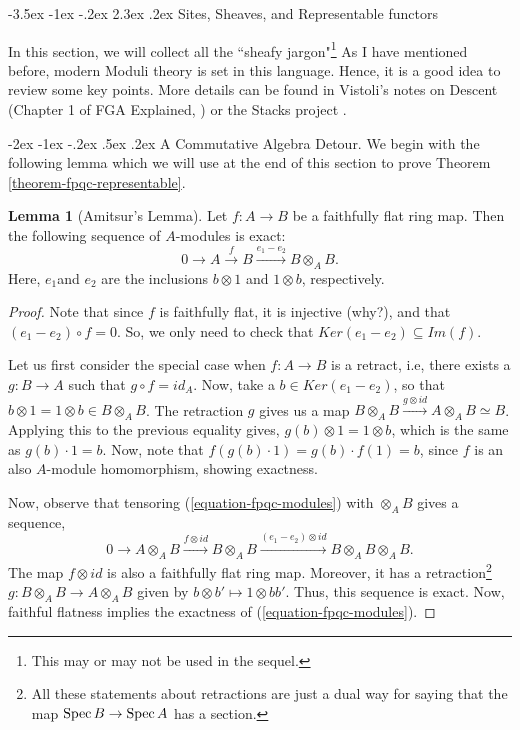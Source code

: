 \documentclass[11pt]{amsart}
\makeatletter
\renewcommand\section{\@startsection {section}{1}{\z@}%
	{-3.5ex \@plus -1ex \@minus -.2ex}%
	{2.3ex \@plus.2ex}%
	{\normalfont\scshape\center}}
\renewcommand\subsection{\@startsection {subsection}{1}{\z@}%
	{-2ex \@plus -1ex \@minus -.2ex}%
	{.5ex \@plus.2ex}%
	{\normalfont\bfseries}}
\newcommand{\Spec}{{\rm Spec \,}}
\theoremstyle{definition}
\newtheorem{lemma}[theorem]{Lemma}
\makeatother
\begin{document}
\section{Sites, Sheaves, and Representable functors}\label{section-sites}

In this section, we will collect all the ``sheafy jargon"\footnote{This may or may not be used in the sequel.} As I have mentioned before, modern Moduli theory is set in this language. Hence, it is a good idea to review some key points. More details can be found in Vistoli's notes on Descent (Chapter 1 of FGA Explained, \cite{FGAExplained}) or the Stacks project \cite{stacks-project}.

\subsection{A Commutative Algebra Detour.}
We begin with the following lemma which we will use at the end of this section to prove Theorem \ref{theorem-fpqc-representable}.

\begin{lemma}[Amitsur's Lemma]\label{lemma-Amitsur}
Let $f: A\rightarrow B$ be a faithfully flat ring map. Then the following sequence of $A$-modules is exact:
\begin{equation}\label{equation-fpqc-modules}
0\rightarrow A\overset{f}{\rightarrow} B \overset{e_1-e_2}{\rightarrow} B\otimes_A B.
\end{equation}
Here, $e_1$and $e_2$ are the inclusions $b\otimes 1$ and $1\otimes b$, respectively.
\end{lemma}
\begin{proof}
Note that since $f$ is faithfully flat, it is injective (why?), and that $(e_1-e_2)\circ f=0$. So, we only need to check that $Ker(e_1-e_2)\subseteq Im(f)$.

Let us first consider the special case when $f:A\rightarrow B$ is a retract, i.e, there exists a $g:B\rightarrow A$ such that $g\circ f = id_A$. Now, take a $b\in Ker(e_1-e_2)$, so that  $b\otimes 1 = 1\otimes b \in B\otimes_A B$. The retraction $g$ gives us a map $B\otimes_A B\overset{g\otimes id}{\rightarrow} A\otimes_A B\simeq B$. Applying this to the previous equality gives, $g(b)\otimes 1=1\otimes b$, which is the same as $g(b)\cdot 1=b$. Now, note that $f(g(b)\cdot 1)=g(b)\cdot f(1)=b$, since $f$ is an also $A$-module homomorphism, showing exactness.

Now, observe that tensoring (\ref{equation-fpqc-modules}) with $\otimes_A B$ gives a sequence,
\[0\longrightarrow A\otimes_A B\overset{f\otimes id}{\longrightarrow} B\otimes_A B \overset{(e_1-e_2)\otimes id}{\longrightarrow} B\otimes_A B\otimes_A B.\]
The map $f\otimes id$ is also a faithfully flat ring map. Moreover, it has a retraction\footnote{All these statements about retractions are just a dual way for saying that the map $\Spec B\rightarrow \Spec A$ has a section.} $g: B\otimes_A B\rightarrow A\otimes_A B$ given by $b\otimes b'\mapsto 1\otimes bb'$. Thus, this sequence is exact. Now, faithful flatness implies the exactness of (\ref{equation-fpqc-modules}).
\end{proof}
\end{document}
